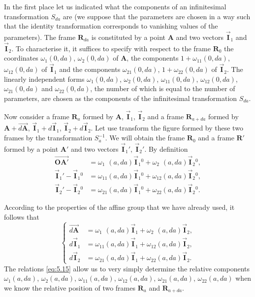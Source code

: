 \documentclass[leqno,11pt]{book}
\numberwithin{equation}{chapter}
\theoremstyle{shape1}
\theoremstyle{shapesmall}
\newcommand{\rvec}[1]{\vec{\mathbf{#1}}}
\newcommand{\ivec}{\rvec{I}}
\begin{document}
In the first place let us indicated what the components of an infinitesimal transformation $S_{da}$ are (we suppose that the parameters are chosen in a way such that the identity transformation corresponds to vanishing values of the parameters). The frame $\mathbf{R}_{da}$ is constituted by a point $\mathbf{A}$ and two vectors $\ivec_{1}$ and $\ivec_{2}$. To characterise it, it suffices to specify with respect to the frame $\mathbf{R}_{0}$ the coordinates $\omega_{1}(0,da)$, $\omega_{2}(0,da)$ of $\mathbf{A}$, the components $1+\omega_{11}(0,da)$, $\omega_{12}(0,da)$ of $\ivec_{1}$ and the components $\omega_{21}(0,da)$, $1+\omega_{22}(0,da)$ of $\ivec_{2}$. The linearly independent forms $\omega_{1}(0,da)$, $\omega_{2}(0,da)$, $\omega_{11}(0,da)$, $\omega_{12}(0,da)$, $\omega_{21}(0,da)$ and $\omega_{22}(0,da)$, the number of which is equal to the number of parameters, are chosen as the components of the infinitesimal transformation $S_{da}$.

Now consider a frame $\mathbf{R}_{a}$ formed by $\mathbf{A}$, $\ivec_{1}$, $\ivec_{2}$ and a frame $\mathbf{R}_{a+da}$ formed by $\mathbf{A}+\overrightarrow{d\mathbf{A}}$, $\ivec_{1}+d\ivec_{1}$, $\ivec_{2}+d\ivec_{2}$. Let use transform the figure formed by these two frames by the transformation $S_{a}^{-1}$. We will obtain the frame $\mathbf{R}_{0}$ and a frame $\mathbf{R}'$ formed by a point $\mathbf{A}'$ and two vectors $\ivec_{1}'$, $\ivec_{2}'$. By definition
\begin{align*}
  \overrightarrow{\mathbf{OA}'}&=\omega_{1\phantom{0}}(a,da)\ivec_{1}{}^{0}+\omega_{2\phantom{0}}(a,da)\ivec_{2}{}^{0},\\
  \ivec_{1}'-\ivec_{1}{}^{0}&=\omega_{11}(a,da)\ivec_{1}{}^{0}+\omega_{12}(a,da)\ivec_{2}{}^{0},\\
  \ivec_{2}'-\ivec_{2}{}^{0}&=\omega_{21}(a,da)\ivec_{1}{}^{0}+\omega_{22}(a,da)\ivec_{2}{}^{0}.
\end{align*}

According to the properties of the affine group that we have already used, it follows that
\begin{equation}
  \label{eq:5.15}
  \left\{
    \begin{aligned}
      \overrightarrow{d\mathbf{A}}&=\omega_{1\phantom{0}}(a,da)\ivec_{1}+\omega_{2\phantom{0}}(a,da)\ivec_{2},\\
      d\ivec_{1}&=\omega_{11}(a,da)\ivec_{1}+\omega_{12}(a,da)\ivec_{2},\\
      d\ivec_{2}&=\omega_{21}(a,da)\ivec_{1}+\omega_{22}(a,da)\ivec_{2}.
    \end{aligned}
  \right.
\end{equation}
The relations \eqref{eq:5.15} allow us to very simply determine the relative components $\omega_{1}(a,da)$, $\omega_{2}(a,da)$, $\omega_{11}(a,da)$, $\omega_{12}(a,da)$, $\omega_{21}(a,da)$, $\omega_{22}(a,da)$ when we know the relative position of two frames $\mathbf{R}_{a}$ and $\mathbf{R}_{a+da}$.
\end{document}
